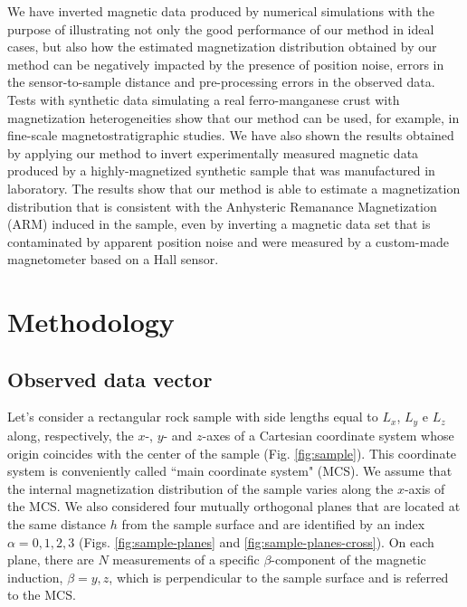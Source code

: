 \documentclass[galley,gc]{agutex}
\begin{document}
\begin{article}
We have inverted magnetic data produced by
numerical simulations with the purpose of illustrating not only the 
good performance of our method in ideal cases, but also how
the estimated magnetization distribution obtained by our
method can be negatively impacted by the presence of position 
noise, errors in the sensor-to-sample distance and 
pre-processing errors in the observed data.
Tests with synthetic data simulating a real ferro-manganese
crust with magnetization heterogeneities show that our method 
can be used, for example, in fine-scale magnetostratigraphic 
studies.
We have also shown the results obtained by applying our method
to invert experimentally measured magnetic data produced by
a highly-magnetized synthetic sample that was manufactured in 
laboratory.
The results show that our method is able to estimate a magnetization
distribution that is consistent with the Anhysteric Remanance 
Magnetization (ARM) induced in the
sample, even by inverting a magnetic data set that is contaminated 
by apparent position noise and were measured by a
custom-made magnetometer based on a Hall sensor.

\section{Methodology}
\label{sec:Methodology}

\subsection{Observed data vector}
\label{subsec:Observed data vector}


Let's consider a rectangular rock sample with side lengths equal 
to $L_{x}$, $L_{y}$ e $L_{z}$ along, respectively, the $x$-, $y$- and 
$z$-axes of a Cartesian coordinate system 
whose origin coincides with the center of the sample 
(Fig. \ref{fig:sample}). 
This coordinate system is conveniently called 
``main coordinate system" (MCS).
We assume that the internal magnetization distribution of the sample
varies along the $x$-axis of the MCS.
We also considered four mutually orthogonal planes that are located 
at the same distance $h$ from the sample surface and are identified 
by an index $\alpha = 0, 1, 2, 3$
(Figs. \ref{fig:sample-planes} and \ref{fig:sample-planes-cross}).
On each plane, there are $N$ measurements of a specific 
$\beta$-component of the magnetic induction, $\beta = y, z$, 
which is perpendicular to the sample surface and is referred
to the MCS.


\end{article}
\end{document}
